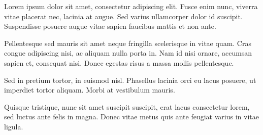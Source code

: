 \begin{acknowledgments}
Lorem ipsum dolor sit amet, consectetur adipiscing elit. Fusce enim nunc,
viverra vitae placerat nec, lacinia at augue. Sed varius ullamcorper dolor
id suscipit. Suspendisse posuere augue vitae sapien faucibus mattis et non
ante.

Pellentesque sed mauris sit amet neque fringilla scelerisque in vitae
quam. Cras congue adipiscing nisi, ac aliquam nulla porta in. Nam id nisi
ornare, accumsan sapien et, consequat nisi. Donec egestas risus a massa
mollis pellentesque.

Sed in pretium tortor, in euismod nisl. Phasellus
lacinia orci eu lacus posuere, ut imperdiet tortor aliquam. Morbi at
vestibulum mauris.

Quisque tristique, nunc sit amet suscipit suscipit, erat
lacus consectetur lorem, sed luctus ante felis in magna. Donec vitae metus
quis ante feugiat varius in vitae ligula.
\end{acknowledgments}